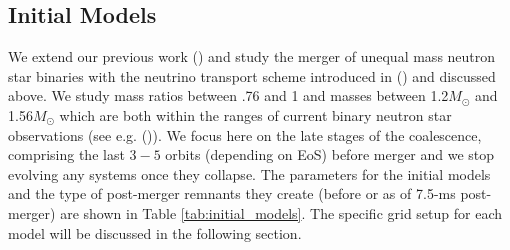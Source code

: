 







\subsection{Initial Models}
\label{sec:initial_models}
We extend our previous work (\citet*{foucart:2015gaa}) and study the merger
of unequal mass neutron star binaries with the neutrino transport scheme introduced in (\citet*{foucart2016impact}) and discussed above. We study mass ratios between .76 and 1 and masses between 1.2$M_\odot$ and 1.56$M_\odot$ which are both within the ranges of current binary neutron star observations (see e.g. (\citet*{lattimer:2012nd})). We focus here on the late stages of the coalescence, comprising the last $3-5$ orbits (depending on EoS) before merger and we stop evolving any systems once they collapse. The parameters for the initial models and the type of post-merger remnants they create (before or as of 7.5-ms post-merger) are shown in Table \ref{tab:initial_models}. The specific grid setup for each model will be discussed in the following section.

